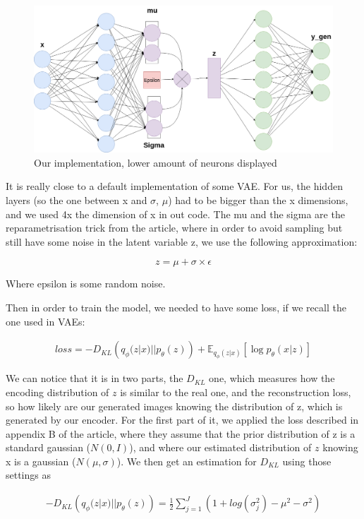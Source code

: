 \documentclass{article} %
\begin{document}
\begin{figure}
  \centering
      \includegraphics[width=1.0\textwidth]{model}
  \caption{Our implementation, lower amount of neurons displayed}
\end{figure}

It is really close to a default implementation of some VAE. For us, the hidden
layers (so the one between x and $\sigma$, $\mu$) had to be bigger than the x
dimensions, and we used 4x the dimension of x in out code. The mu and the sigma
are the reparametrisation trick from the article, where in order to avoid
sampling but still have some noise in the latent variable z, we use the
following approximation:

$$z = \mu + \sigma \times \epsilon$$

Where epsilon is some random noise.

Then in order to train the model, we needed to have some loss, if we recall the
one used in VAEs:

\begin{align}\label{loss1}
  loss =-D_{KL}\left(
  q_\phi(z|x)||p_\theta(z) \right)+\mathbb{E}_{q_\phi(z|x)}\left[ \log p_\theta(x|z) \right]
\end{align}

We can notice that it is in two parts, the $D_{KL}$ one, which measures how the
encoding distribution of $z$ is similar to the real one, and the reconstruction
loss, so how likely are our generated images knowing the distribution of z,
which is generated by our encoder. For the first part of it, we applied the loss
described in appendix B of the article, where they assume that the prior distribution
of z is a standard gaussian ($N(0, I)$), and where our estimated distribution of
$z$ knowing x is a gaussian ($N(\mu, \sigma)$). We then get an estimation for
$D_{KL}$ using those settings as

\begin{align}\label{loss1}
  -D_{KL}\left(q_\phi(z|x)||p_\theta(z) \right) = \frac{1}{2} \sum\limits_{j=1}^J (1 + log(\sigma_j^2) - \mu^2 - \sigma^2)
\end{align}
\end{document}
